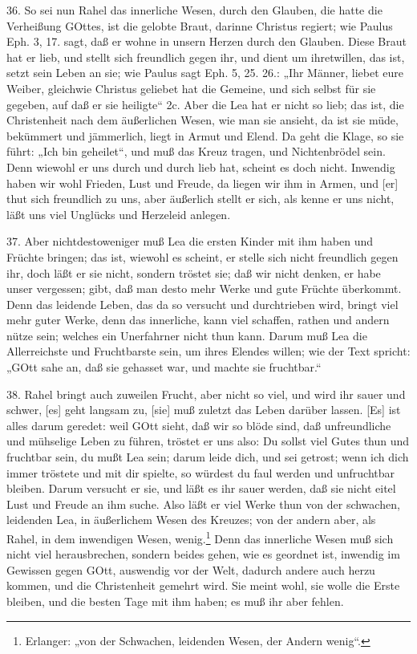 36. So sei nun Rahel das innerliche Wesen, durch den Glauben, die hatte die Verheißung GOttes, ist die gelobte Braut, darinne Christus regiert; wie Paulus Eph. 3, 17. sagt, daß er wohne in unsern Herzen durch den Glauben. Diese Braut hat er lieb, und stellt sich freundlich gegen ihr, und dient um ihretwillen, das ist, setzt sein Leben an sie; wie Paulus sagt Eph. 5, 25. 26.: „Ihr Männer, liebet eure Weiber, gleichwie Christus geliebet hat die Gemeine, und sich selbst für sie gegeben, auf daß er sie heiligte“ 2c. Aber die Lea hat er nicht so lieb; das ist, die Christenheit nach dem äußerlichen Wesen, wie man sie ansieht, da ist sie müde, bekümmert und jämmerlich, liegt in Armut und Elend. Da geht die Klage, so sie führt: „Ich bin geheilet“, und muß das Kreuz tragen, und Nichtenbrödel sein. Denn wiewohl er uns durch und durch lieb hat, scheint es doch nicht. Inwendig haben wir wohl Frieden, Lust und Freude, da liegen wir ihm in Armen, und [er] thut sich freundlich zu uns, aber äußerlich stellt er sich, als kenne er uns nicht, läßt uns viel Unglücks und Herzeleid anlegen.

37. Aber nichtdestoweniger muß Lea die ersten Kinder mit ihm haben und Früchte bringen; das ist, wiewohl es scheint, er stelle sich nicht freundlich gegen ihr, doch läßt er sie nicht, sondern tröstet sie; daß wir nicht denken, er habe unser vergessen; gibt, daß man desto mehr Werke und gute Früchte überkommt. Denn das leidende Leben, das da so versucht und durchtrieben wird, bringt viel mehr guter Werke, denn das innerliche, kann viel schaffen, rathen und andern nütze sein; welches ein Unerfahrner nicht thun kann. Darum muß Lea die Allerreichste und Fruchtbarste sein, um ihres Elendes willen; wie der Text spricht: „GOtt sahe an, daß sie gehasset war, und machte sie fruchtbar.“

38. Rahel bringt auch zuweilen Frucht, aber nicht so viel, und wird ihr sauer und schwer, [es] geht langsam zu, [sie] muß zuletzt das Leben darüber lassen. [Es] ist alles darum geredet: weil GOtt sieht, daß wir so blöde sind, daß unfreundliche und mühselige Leben zu führen, tröstet er uns also: Du sollst viel Gutes thun und fruchtbar sein, du mußt Lea sein; darum leide dich, und sei getrost; wenn ich dich immer tröstete und mit dir spielte, so würdest du faul werden und unfruchtbar bleiben. Darum versucht er sie, und läßt es ihr sauer werden, daß sie nicht eitel Lust und Freude an ihm suche. Also läßt er viel Werke thun von der schwachen, leidenden Lea, in äußerlichem Wesen des Kreuzes; von der andern aber, als Rahel, in dem inwendigen Wesen, wenig.\footnote{Erlanger: „von der Schwachen, leidenden Wesen, der Andern wenig“.} Denn das innerliche Wesen muß sich nicht viel herausbrechen, sondern beides gehen, wie es geordnet ist, inwendig im Gewissen gegen GOtt, auswendig vor der Welt, dadurch andere auch herzu kommen, und die Christenheit gemehrt wird. Sie meint wohl, sie wolle die Erste bleiben, und die besten Tage mit ihm haben; es muß ihr aber fehlen.

